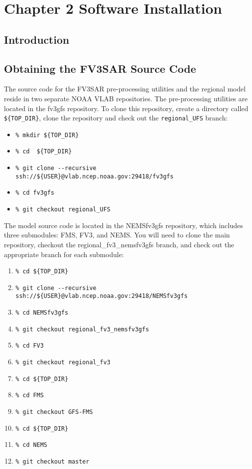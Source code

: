 \chapter{Chapter 2 Software Installation}
 
\section{Introduction}
\section{Obtaining the FV3SAR Source Code} \label{obtain_src}
The source code for the FV3SAR pre-processing utilities and the regional model reside in two separate 
NOAA VLAB repositories.  The pre-processing utilities are located in the fv3gfs repository.  To clone
this repository, create a directory called \verb|${TOP_DIR}|, clone the repository and check out the 
\verb|regional_UFS| branch:

    \begin{itemize}
       \item[] \verb|% mkdir ${TOP_DIR}|
       \item[] \verb|% cd  ${TOP_DIR}|
       \item[] \verb|% git clone --recursive ssh://${USER}@vlab.ncep.noaa.gov:29418/fv3gfs|
       \item[] \verb|% cd fv3gfs|
       \item[] \verb|% git checkout regional_UFS|
    \end{itemize}

The model source code is located in the NEMSfv3gfs repository, which includes three submodules: FMS, FV3,
and NEMS.  You will need to clone the main repository, checkout the regional\_fv3\_nemsfv3gfs branch, and
check out the appropriate branch for each submodule:

    \begin{enumerate}
       \item[] \verb|% cd ${TOP_DIR}|
       \item[] \verb|% git clone --recursive ssh://${USER}@vlab.ncep.noaa.gov:29418/NEMSfv3gfs|
       \item[] \verb|% cd NEMSfv3gfs|
       \item[] \verb|% git checkout regional_fv3_nemsfv3gfs|
       \item[] \verb|% cd FV3|
       \item[] \verb|% git checkout regional_fv3|
       \item[] \verb|% cd ${TOP_DIR}|
       \item[] \verb|% cd FMS|
       \item[] \verb|% git checkout GFS-FMS|
       \item[] \verb|% cd ${TOP_DIR}|
       \item[] \verb|% cd NEMS|
       \item[] \verb|% git checkout master|
    \end{enumerate}

